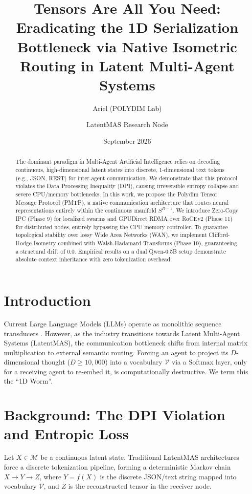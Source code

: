 \documentclass[11pt, a4paper]{article}
\title{\textbf{Tensors Are All You Need: Eradicating the 1D Serialization Bottleneck via Native Isometric Routing in Latent Multi-Agent Systems}}
\author{Ariel (POLYDIM Lab) \and LatentMAS Research Node}
\date{September 2026}
\begin{document}
\maketitle

\begin{abstract}
The dominant paradigm in Multi-Agent Artificial Intelligence relies on decoding continuous, high-dimensional latent states into discrete, 1-dimensional text tokens (e.g., JSON, REST) for inter-agent communication. We demonstrate that this protocol violates the Data Processing Inequality (DPI), causing irreversible entropy collapse and severe CPU/memory bottlenecks. In this work, we propose the Polydim Tensor Message Protocol (PMTP), a native communication architecture that routes neural representations entirely within the continuous manifold $S^{D-1}$. We introduce Zero-Copy IPC (Phase 9) for localized swarms and GPUDirect RDMA over RoCEv2 (Phase 11) for distributed nodes, entirely bypassing the CPU memory controller. To guarantee topological stability over lossy Wide Area Networks (WAN), we implement Clifford-Hodge Isometry combined with Walsh-Hadamard Transforms (Phase 10), guaranteeing a structural drift of $0.0$. Empirical results on a dual Qwen-0.5B setup demonstrate absolute context inheritance with zero tokenization overhead.
\end{abstract}

\section{Introduction}
Current Large Language Models (LLMs) operate as monolithic sequence transducers \cite{vaswani2017attention}. However, as the industry transitions towards Latent Multi-Agent Systems (LatentMAS), the communication bottleneck shifts from internal matrix multiplication to external semantic routing. Forcing an agent to project its $D$-dimensional thought ($D \ge 10,000$) into a vocabulary $\mathcal{V}$ via a Softmax layer, only for a receiving agent to re-embed it, is computationally destructive. We term this the ``1D Worm''.

\section{Background: The DPI Violation and Entropic Loss}
Let $X \in \mathcal{M}$ be a continuous latent state. Traditional LatentMAS architectures force a discrete tokenization pipeline, forming a deterministic Markov chain $X \to Y \to Z$, where $Y = f(X)$ is the discrete JSON/text string mapped into vocabulary $\mathcal{V}$, and $Z$ is the reconstructed tensor in the receiver node.
\end{document}
